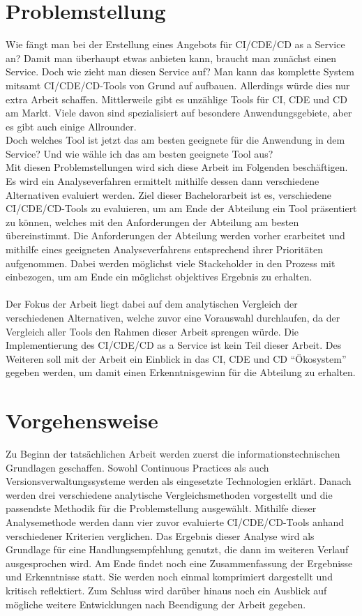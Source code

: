 \section{Problemstellung} 
Wie fängt man bei der Erstellung eines Angebots für \ac{CI}/\ac{CDE}/\ac{CD} as a Service an? Damit man überhaupt etwas anbieten kann, braucht man zunächst einen Service. Doch wie zieht man diesen Service auf? Man kann das komplette System mitsamt \ac{CI}/\ac{CDE}/\ac{CD}-Tools von Grund auf aufbauen. Allerdings würde dies nur extra Arbeit schaffen. Mittlerweile gibt es unzählige Tools für \ac{CI}, \ac{CDE} und \ac{CD} am Markt. Viele davon sind spezialisiert auf besondere Anwendungsgebiete, aber es gibt auch einige Allrounder.\\ Doch welches Tool ist jetzt das am besten geeignete für die Anwendung in dem Service? Und wie wähle ich das am besten geeignete Tool aus?\\
Mit diesen Problemstellungen wird sich diese Arbeit im Folgenden beschäftigen. Es wird ein Analyseverfahren ermittelt mithilfe dessen dann verschiedene Alternativen evaluiert werden.
Ziel dieser Bachelorarbeit ist es, verschiedene \ac{CI}/\ac{CDE}/\ac{CD}-Tools zu evaluieren, um am Ende der Abteilung ein Tool präsentiert zu können, welches mit den Anforderungen der Abteilung am besten übereinstimmt. Die Anforderungen der Abteilung werden vorher erarbeitet und mithilfe eines geeigneten Analyseverfahrens entsprechend ihrer Prioritäten aufgenommen. Dabei werden möglichst viele Stackeholder in den Prozess mit einbezogen, um am Ende ein möglichst objektives Ergebnis zu erhalten.\\
\\
Der Fokus der Arbeit liegt dabei auf dem analytischen Vergleich der verschiedenen Alternativen, welche zuvor eine Vorauswahl durchlaufen, da der Vergleich aller Tools den Rahmen dieser Arbeit sprengen würde. Die Implementierung des \ac{CI}/\ac{CDE}/\ac{CD} as a Service ist kein Teil dieser Arbeit. Des Weiteren  soll mit der Arbeit ein Einblick in das \ac{CI}, \ac{CDE} und \ac{CD} \enquote{Ökosystem} gegeben werden, um damit einen Erkenntnisgewinn für die Abteilung zu erhalten.
\section{Vorgehensweise}
Zu Beginn der tatsächlichen Arbeit werden zuerst die informationstechnischen Grundlagen geschaffen. Sowohl Continuous Practices als auch Versionsverwaltungssysteme werden als eingesetzte Technologien erklärt. Danach werden drei verschiedene analytische Vergleichsmethoden vorgestellt und die passendste Methodik für die Problemstellung ausgewählt. Mithilfe dieser Analysemethode werden dann vier zuvor evaluierte \ac{CI}/\ac{CDE}/\ac{CD}-Tools anhand verschiedener Kriterien verglichen. Das Ergebnis dieser Analyse wird als Grundlage für eine Handlungsempfehlung genutzt, die dann im weiteren Verlauf ausgesprochen wird. Am Ende findet noch eine Zusammenfassung der Ergebnisse und Erkenntnisse statt. Sie werden noch einmal komprimiert dargestellt und kritisch reflektiert. Zum Schluss wird darüber hinaus noch ein Ausblick auf mögliche weitere Entwicklungen nach Beendigung der Arbeit gegeben.
